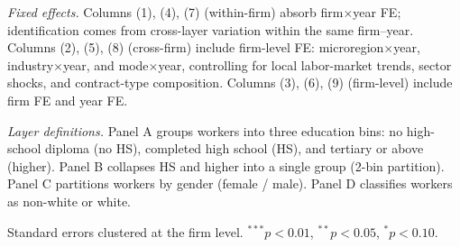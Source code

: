 \begin{table}[H]
\begin{minipage}{\linewidth}
\textit{Fixed effects.} Columns (1), (4), (7) (within-firm) absorb firm$\times$year FE; identification comes from cross-layer variation within the same firm--year. Columns (2), (5), (8) (cross-firm) include firm-level FE: microregion$\times$year, industry$\times$year, and mode$\times$year, controlling for local labor-market trends, sector shocks, and contract-type composition. Columns (3), (6), (9) (firm-level) include firm FE and year FE.

\textit{Layer definitions.} Panel A groups workers into three education bins: no high-school diploma (no HS), completed high school (HS), and tertiary or above (higher). Panel B collapses HS and higher into a single group (2-bin partition). Panel C partitions workers by gender (female / male). Panel D classifies workers as non-white or white.

Standard errors clustered at the firm level. $^{***}p<0.01$, $^{**}p<0.05$, $^{*}p<0.10$.
\end{minipage}
\end{table}